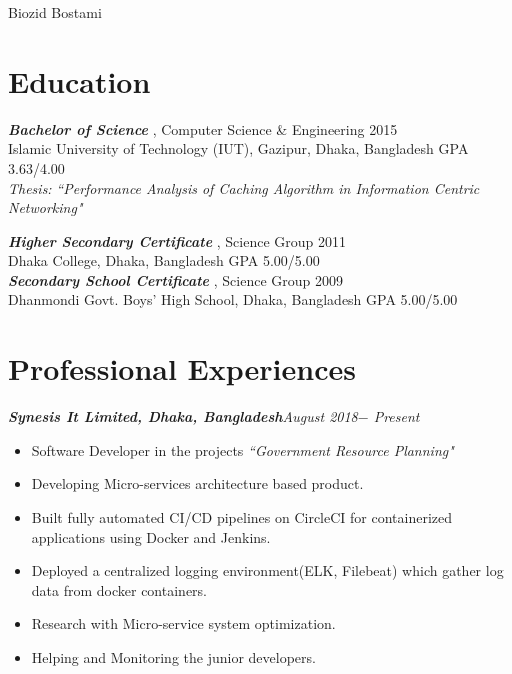 \documentclass[11pt, a4paper]{awesome-cv}
\begin{document}
\makecvheader
\makecvfooter
  {}
  {Biozid Bostami}
  {\thepage}
  
\section*{Education}
\vspace{-20pt}
\noindent\makebox[\linewidth]{\rule{500pt}{1.8pt}}

{\sl \textbf{Bachelor of Science }}, Computer Science \& Engineering  \hfill 2015\\
Islamic University of Technology (IUT), Gazipur, Dhaka, Bangladesh \hspace{0.2in}  GPA 3.63/4.00  \\
{\sl Thesis:} {\sl ``Performance Analysis of Caching Algorithm in Information Centric Networking"}

{\sl \textbf{Higher Secondary Certificate }}, Science Group \hfill 2011\\
Dhaka College, Dhaka, Bangladesh \hspace{0.2in}  GPA 5.00/5.00  \\

\vspace*{-1em}
{\sl \textbf{Secondary School Certificate }}, Science Group \hfill 2009\\
Dhanmondi Govt. Boys' High School, Dhaka, Bangladesh \hspace{0.2in}  GPA 5.00/5.00  \\

\vspace{-27pt}
\section*{Professional Experiences}
\vspace{-20pt}
\noindent\makebox[\linewidth]{\rule{500pt}{1.8pt}}

{\sl \textbf{Synesis It Limited, Dhaka, Bangladesh}\hfill August 2018$-$ Present}\\
\vspace{-17pt}
\begin{itemize}
	\item Software Developer in the projects {\sl ``Government Resource Planning"} 
	\vspace*{-.5em}
	\item Developing Micro-services architecture based product.
	\vspace*{-.5em}
	\item Built fully automated CI/CD pipelines on CircleCI for containerized applications using Docker and Jenkins.
	\vspace*{-.5em}
    \item Deployed a centralized logging environment(ELK, Filebeat) which gather log data from docker containers.
    	\vspace*{-.5em}
    \item Research with Micro-service system optimization.  
        	\vspace*{-.5em}
    \item Helping and Monitoring the junior developers.  
\end{itemize}
\end{document}
